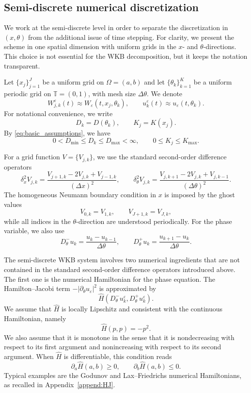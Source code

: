 \documentclass[11pt]{article}
\begin{document}
\subsection{Semi-discrete numerical discretization}

We work at the semi-discrete level in order to separate the discretization in
\((x,\theta)\) from the additional issue of time stepping. For clarity, we
present the scheme in one spatial dimension with uniform grids in the
\(x\)- and \(\theta\)-directions. This choice is not essential for the WKB
decomposition, but it keeps the notation transparent.

Let \(\{x_j\}_{j=1}^J\) be a uniform grid on \(\Omega=(a,b)\) and let
\(\{\theta_k\}_{k=1}^K\) be a uniform periodic grid on \(\mathbb T=(0,1)\),
with mesh size \(\Delta\theta\). We denote
\[
W_{j,k}^\varepsilon(t)\approx W_\varepsilon(t,x_j,\theta_k),
\qquad
u_k^\varepsilon(t)\approx u_\varepsilon(t,\theta_k).
\]
For notational convenience, we write
\[
D_k=D(\theta_k),
\qquad
K_j=K(x_j).
\]
By \eqref{eq:basic_assumptions}, we have 
\[
    0<D_{\min}\le D_k\le D_{\max}<\infty,
    \qquad
    0\le K_j\le K_{\max}.
\]


For a grid function \(V=\{V_{j,k}\}\), we use the standard second-order
difference operators
\[
\delta_x^2 V_{j,k}
=
\frac{V_{j+1,k}-2V_{j,k}+V_{j-1,k}}{(\Delta x)^2},
\qquad
\delta_\theta^2 V_{j,k}
=
\frac{V_{j,k+1}-2V_{j,k}+V_{j,k-1}}{(\Delta\theta)^2}.
\]
The homogeneous Neumann boundary condition in \(x\) is imposed by the ghost
values
\[
V_{0,k}=V_{1,k},
\qquad
V_{J+1,k}=V_{J,k},
\]
while all indices in the \(\theta\)-direction are understood periodically.
For the phase variable, we also use
\[
D_\theta^-u_k
=
\frac{u_k-u_{k-1}}{\Delta\theta},
\qquad
D_\theta^+u_k
=
\frac{u_{k+1}-u_k}{\Delta\theta}.
\]

The semi-discrete WKB system involves two numerical ingredients that are not
contained in the standard second-order difference operators introduced above.
The first one is the numerical Hamiltonian for the phase equation. The
Hamilton--Jacobi term \(-|\partial_\theta u_\varepsilon|^2\) is approximated by
\[
\widehat H(D_\theta^-u_k^\varepsilon,D_\theta^+u_k^\varepsilon).
\]
We assume that \(\widehat H\) is locally Lipschitz and consistent with the
continuous Hamiltonian, namely
\[
\widehat H(p,p)=-p^2 .
\]
We also assume that it is monotone in the sense that it is nondecreasing with
respect to its first argument and nonincreasing with respect to its second
argument. When \(\widehat H\) is differentiable, this condition reads
\[
\partial_a\widehat H(a,b)\ge0,
\qquad
\partial_b\widehat H(a,b)\le0 .
\]
Typical examples are the Godunov and Lax--Friedrichs numerical Hamiltonians,
as recalled in Appendix~\ref{append:HJ}.
\end{document}
